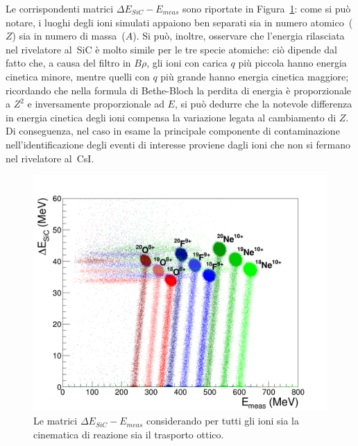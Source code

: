Le corrispondenti matrici $\Delta E_{SiC} - E_{meas}$ sono riportate in Figura~\ref{fig:deltaE_Emeas_PID}: come si può notare, i luoghi degli ioni simulati appaiono ben separati sia in numero atomico~($Z$) sia in numero di massa~($A$).
Si può, inoltre, osservare che l'energia rilasciata nel rivelatore al~SiC è molto simile per le tre specie atomiche: 
ciò dipende dal fatto che, a causa del filtro in $B \rho$, gli ioni con carica $q$ più piccola hanno energia cinetica minore, mentre quelli con $q$ più grande hanno energia cinetica maggiore; ricordando che nella formula di Bethe-Bloch la perdita di energia è proporzionale a $Z^2$ e inversamente proporzionale ad $E$, si può dedurre che la notevole differenza in energia cinetica degli ioni compensa la variazione legata al cambiamento di $Z$.
Di conseguenza, nel caso in esame la principale componente di contaminazione nell'identificazione degli eventi di interesse proviene dagli ioni che non si fermano nel rivelatore al~CsI.
\begin{figure} [!p]
	\centering
	\includegraphics[width=\textwidth, keepaspectratio]{Grafici_Tesi2/PID/deltaE_Emeas_quadrata2.png}
	\caption{Le matrici $\Delta E_{SiC} - E_{meas}$ considerando per tutti gli ioni sia la cinematica di reazione sia il trasporto ottico.} \label{fig:deltaE_Emeas_PID}
\end{figure}

